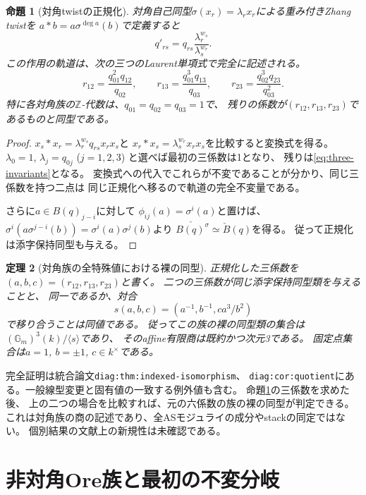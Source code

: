 \documentclass[11pt,a4paper]{ltjsarticle}
\newtheorem{theorem}{定理}[section]
\newtheorem{proposition}[theorem]{命題}
\theoremstyle{definition}
\newcommand{\ZZ}{\mathbb Z}
\newcommand{\GG}{\mathbb G}
\begin{document}
\begin{proposition}[対角twistの正規化]\label{prop:twist-normalization}
対角自己同型$\sigma(x_r)=\lambda_r x_r$による重み付きZhang twistを
$a*b=a\sigma^{\deg a}(b)$で定義すると
\[
q'_{rs}=q_{rs}\frac{\lambda_r^{w_s}}{\lambda_s^{w_r}}.
\]
この作用の軌道は、次の三つのLaurent単項式で完全に記述される。
\begin{equation}\label{eq:three-invariants}
r_{12}=\frac{q_{01}^2q_{12}}{q_{02}},\qquad
r_{13}=\frac{q_{01}^3q_{13}}{q_{03}},\qquad
r_{23}=\frac{q_{02}^3q_{23}}{q_{03}^2}.
\end{equation}
特に各対角族の$\ZZ$-代数は、$q_{01}=q_{02}=q_{03}=1$で、
残りの係数が$(r_{12},r_{13},r_{23})$であるものと同型である。
\end{proposition}
\begin{proof}
$x_s*x_r=\lambda_r^{w_s}q_{rs}x_rx_s$と
$x_r*x_s=\lambda_s^{w_r}x_rx_s$を比較すると変換式を得る。
$\lambda_0=1$, $\lambda_j=q_{0j}$ ($j=1,2,3$) と選べば最初の三係数は1となり、
残りは\eqref{eq:three-invariants}となる。
変換式への代入でこれらが不変であることが分かり、同じ三係数を持つ二点は
同じ正規化へ移るので軌道の完全不変量である。

さらに$a\in B(q)_{j-i}$に対して
$\phi_{ij}(a)=\sigma^i(a)$と置けば、
$\sigma^i(a\sigma^{j-i}(b))=\sigma^i(a)\sigma^j(b)$より
$\check{B(q)^\sigma}\simeq\check B(q)$を得る。
従って正規化は添字保持同型も与える。
\end{proof}

\begin{theorem}[対角族の全特殊値における裸の同型]\label{thm:diagonal-indexed-summary}
正規化した三係数を$(a,b,c)=(r_{12},r_{13},r_{23})$と書く。
二つの三係数が同じ添字保持同型類を与えることと、
同一であるか、対合
\[
s(a,b,c)=(a^{-1},b^{-1},ca^3/b^2)
\]
で移り合うことは同値である。
従ってこの族の裸の同型類の集合は$(\GG_m)^3(k)/\langle s\rangle$であり、
そのaffine有限商は既約かつ次元3である。
固定点集合は$a=1$, $b=\pm1$, $c\in k^\times$である。
\end{theorem}
完全証明は統合論文\texttt{diag:thm:indexed-isomorphism}、
\texttt{diag:cor:quotient}にある。一般線型変更と固有値の一致する例外値も含む。
命題\ref{prop:twist-normalization}の三係数を求めた後、
上の二つの場合を比較すれば、元の六係数の族の裸の同型が判定できる。
これは対角族の商の記述であり、全ASモジュライの成分やstackの同定ではない。
個別結果の文献上の新規性は未確認である。

\section{非対角Ore族と最初の不変分岐}
\end{document}
